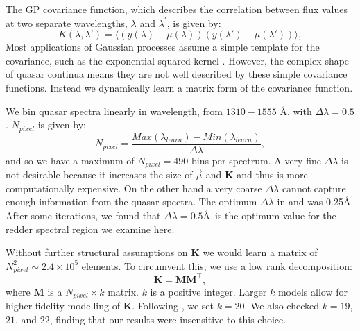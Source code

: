 \documentclass[fleqn,usenatbib]{mnras}
\begin{document}

The GP covariance function, which describes the correlation between flux values at two separate wavelengths, $\lambda$ and $\lambda^{\prime}$, is given by:
\begin{equation}
     K(\lambda, \lambda') = \langle (y(\lambda) - \mu(\lambda)) (y(\lambda') - \mu(\lambda'))  \rangle,
    \label{eq:gp_mean_cov}
\end{equation}
Most applications of Gaussian processes assume a simple template for the covariance, such as the exponential squared kernel \citep{GPbook}.
However, the complex shape of quasar continua means they are not
well described by these simple covariance functions.
Instead we dynamically learn a matrix form of the covariance function.

We bin quasar spectra linearly in wavelength, from $1310 - 1555$ \AA,
with $\Delta \lambda = 0.5$. $N_{pixel}$ is given by:
\begin{equation}
  N_{pixel} = \frac{Max(\lambda_{learn}) - Min(\lambda_{learn})}{\Delta\lambda},
\end{equation}
and so we have a maximum of $N_{pixel} = 490$ bins per spectrum.
A very fine $\Delta \lambda$ is not desirable because it increases the size of
 $\vec\mu$ and $\mathbf{K}$ and thus is more computationally expensive. On the other hand a very coarse $\Delta\lambda$ cannot capture enough information from the quasar
 spectra. The optimum $\Delta\lambda$ in \cite{romanDLA} and \citep{mfDLA}
was 0.25\AA. After some iterations, we found that $\Delta\lambda=0.5$\AA\ is the optimum value for the redder spectral region we examine here.

Without further structural assumptions on $\mathbf{K}$ we would
learn a matrix of $N_{pixel}^2 \sim 2.4 \times 10^5$ elements.
To circumvent this, we use a low rank decomposition:
\begin{equation}
  \mathbf{K} = \mathbf{M}\mathbf{M}^{\top},
  \label{eq:K}
\end{equation}
where $\textbf{M}$ is a $N_{pixel} \times k$ matrix.
$k$ is a positive integer.
Larger $k$ models allow for higher fidelity modelling of $\mathbf{K}$.
Following \cite{romanDLA}, we set $k=20$. We also checked
$k=19$, $21$, and $22$, finding that our results were insensitive to this choice. %
\end{document}
